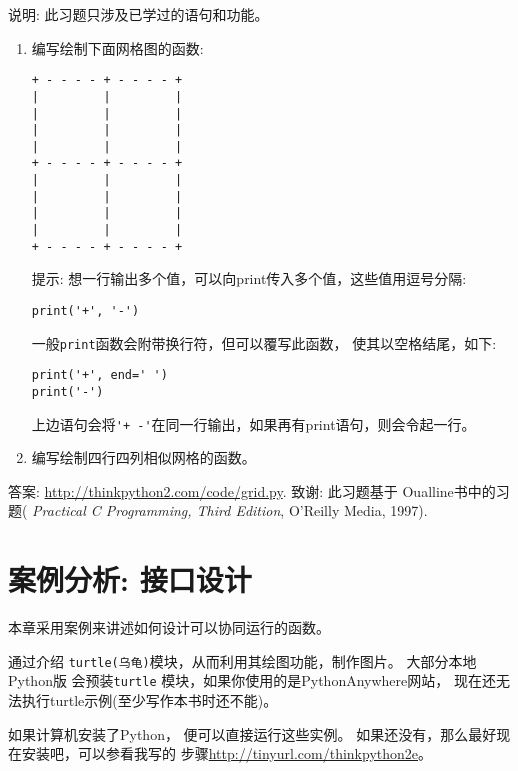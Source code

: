 \documentclass[10pt]{book}
\begin{document}
\begin{exercise}

说明: 此习题只涉及已学过的语句和功能。

\begin{enumerate}

\item 编写绘制下面网格图的函数:

\begin{verbatim}
+ - - - - + - - - - +
|         |         |
|         |         |
|         |         |
|         |         |
+ - - - - + - - - - +
|         |         |
|         |         |
|         |         |
|         |         |
+ - - - - + - - - - +
\end{verbatim}
%
提示: 想一行输出多个值，可以向print传入多个值，这些值用逗号分隔:

\begin{verbatim}
print('+', '-')
\end{verbatim}
%
一般{\tt print}函数会附带换行符，但可以覆写此函数，
使其以空格结尾，如下:

\begin{verbatim}
print('+', end=' ')
print('-')
\end{verbatim}
%
上边语句会将\verb"'+ -'"在同一行输出，如果再有print语句，则会令起一行。

\item 编写绘制四行四列相似网格的函数。

\end{enumerate}

答案: \url{http://thinkpython2.com/code/grid.py}.
致谢: 此习题基于 Oualline书中的习题( {\em
    Practical C Programming, Third Edition},  O'Reilly Media, 1997).

\end{exercise}


\chapter{案例分析: 接口设计}
\label{turtlechap}

本章采用案例来讲述如何设计可以协同运行的函数。

通过介绍 {\tt turtle(乌龟)}模块，从而利用其绘图功能，制作图片。
大部分本地Python版 会预装{\tt turtle} 模块，如果你使用的是PythonAnywhere网站，
现在还无法执行turtle示例(至少写作本书时还不能)。

如果计算机安装了Python， 便可以直接运行这些实例。
如果还没有，那么最好现在安装吧，可以参看我写的
步骤\url{http://tinyurl.com/thinkpython2e}。
\end{document}
